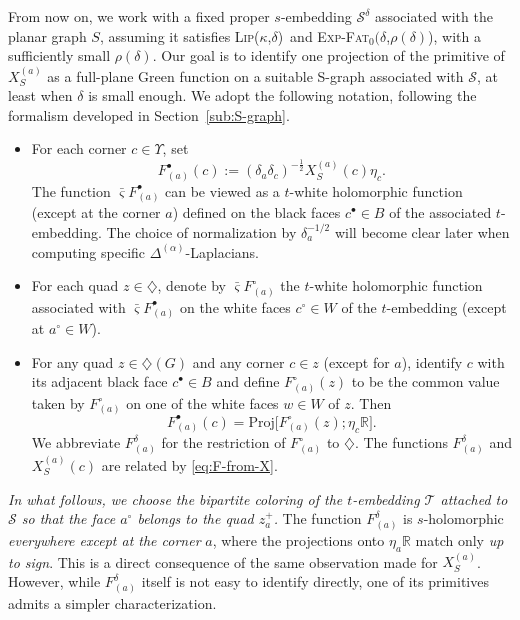 \documentclass[reqno]{amsart}
\numberwithin{equation}{section}
\theoremstyle{definition}
\theoremstyle{remark}
\newcommand\cS{\mathcal{S}}
\newcommand\cT{\mathcal{T}}
\def\LipKd{{\mbox{\textsc{Lip(}$\kappa$\textsc{,}$\delta$\textsc{)}}}}
\def\ExpFat{{{\mbox{\textsc{Exp-Fat}$_0(\delta$\textsc{,}$\rho(\delta)$\textsc{)}}}}}
\begin{document}
From now on, we work with a fixed proper $s$-embedding $\mathcal{S}^\delta$ associated with the planar graph $S$, assuming it satisfies \LipKd\ and \ExpFat, with a sufficiently small $\rho(\delta)$. Our goal is to identify one projection of the primitive of $X_{S}^{(a)}$ as a full-plane Green function on a suitable S-graph associated with $\cS$, at least when $\delta$ is small enough. We adopt the following notation, following the formalism developed in Section~\ref{sub:S-graph}.
\begin{itemize}
    \item For each corner $c \in \Upsilon$, set
    \[
        F_{(a)}^\bullet(c) := (\delta_a \delta_c)^{-\frac{1}{2}} X_{S}^{(a)}(c)\eta_c.
    \]
    The function $\bar{\varsigma} F_{(a)}^\bullet$ can be viewed as a $t$-white holomorphic function (except at the corner $a$) defined on the black faces $c^\bullet \in B$ of the associated $t$-embedding. The choice of normalization by $\delta_a^{-1/2}$ will become clear later when computing specific $\Delta^{(\alpha)}$-Laplacians.
    
    \item For each quad $z \in \diamondsuit$, denote by $\bar{\varsigma} F_{(a)}^\circ$ the $t$-white holomorphic function associated with $\bar{\varsigma} F_{(a)}^\bullet$ on the white faces $c^\circ \in W$ of the $t$-embedding (except at $a^\circ \in W$).
    
    \item For any quad $z \in \diamondsuit(G)$ and any corner $c \in z$ (except for $a$), identify $c$ with its adjacent black face $c^\bullet \in B$ and define $F_{(a)}^{\circ}(z)$ to be the common value taken by $F_{(a)}^{\circ}$ on one of the white faces $w \in W$ of $z$. Then
    \[
        F_{(a)}^\bullet(c) = \mathrm{Proj}\big[F_{(a)}^{\circ}(z); \eta_c \mathbb{R}\big].
    \]
    We abbreviate $F_{(a)}^\delta$ for the restriction of $F_{(a)}^{\circ}$ to $\diamondsuit$. The functions $F_{(a)}^{\delta}$ and $X_{S}^{(a)}(c)$ are related by \eqref{eq:F-from-X}.
\end{itemize}

\textit{In what follows, we choose the bipartite coloring of the $t$-embedding $\cT$ attached to $\cS$ so that the face $a^\circ$ belongs to the quad $z_a^{+}$.} The function $F_{(a)}^\delta$ is $s$-holomorphic \emph{everywhere except at the corner} $a$, where the projections onto $\eta_a \mathbb{R}$ match only \emph{up to sign}. This is a direct consequence of the same observation made for $X_{S}^{(a)}$. However, while $F_{(a)}^\delta$ itself is not easy to identify directly, one of its primitives admits a simpler characterization.
\end{document}
